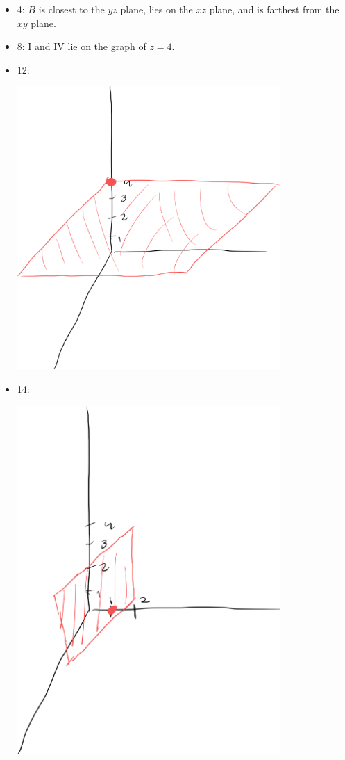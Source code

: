 \documentclass[10pt]{extarticle}
\title{}
\author{Avinash Iyer}
\date{}
\begin{document}
  \begin{problem}{12.1}
    \begin{itemize}
      \item 4: $B$ is closest to the $yz$ plane, lies on the $xz$ plane, and is farthest from the $xy$ plane.
      \item 8: I and IV lie on the graph of $z=4$.
      \item 12:
        \begin{center}
          \includegraphics[width=10cm]{12_1_12}
        \end{center}
      \item 14:
        \begin{center}
          \includegraphics[width=10cm]{12_1_14}

\end{center}
\end{itemize}
\end{problem}
\end{document}
